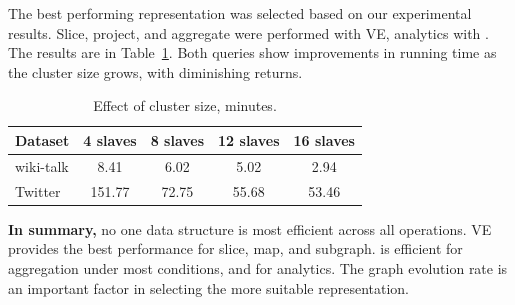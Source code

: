 The best performing representation was selected based on our
experimental results.  Slice, project, and aggregate were performed
with VE, analytics with \hg.  The results are in
Table~\ref{tab:clustersize}.  Both queries show improvements in
running time as the cluster size grows, with diminishing returns.

\begin{table}
\centering
\caption{Effect of cluster size, minutes.}
\vspace{-0.1in}
\small
\begin{tabular}{| l | c | c | c | c |}
\hline
\multicolumn{1}{|l|}{\bfseries Dataset} & \multicolumn{1}{c|}{\bfseries 4 slaves} & \multicolumn{1}{c|}{\bfseries 8 slaves} & \multicolumn{1}{c|}{\bfseries 12 slaves} & \multicolumn{1}{c|}{\bfseries 16 slaves}\\ \hline
wiki-talk & 8.41 & 6.02 & 5.02 & 2.94 \\ \hline
Twitter & 151.77 & 72.75 & 55.68 & 53.46 \\ \hline
\end{tabular}
\label{tab:clustersize}
\end{table}

{\bf In summary,} no one data structure is most efficient across all
operations.  VE provides the best performance for slice, map, and
subgraph.  \og is efficient for aggregation under most conditions, and
\hg for analytics.  The graph evolution rate is an important factor in
selecting the more suitable representation.
